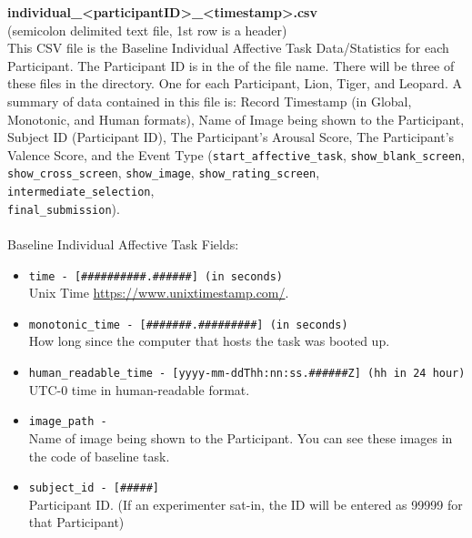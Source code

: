 \begin{description}
\begin{addmargin}[0em]{0em}
        \begin{addmargin}[1em]{0em} %
            \label{individual_<participantID>_<timestamp>.csv}
            \textbf{individual\_<participantID>\_<timestamp>.csv}\\(semicolon delimited text file, 1st row is a header)\\
            This CSV file is the Baseline Individual Affective Task Data/Statistics for
            each Participant. The Participant ID is in the of the file name. There will be
            three of these files in the directory. One for each Participant, Lion, Tiger,
            and Leopard. A summary of data contained in this file is: Record Timestamp (in
            Global, Monotonic, and Human formats), Name of Image being shown to the
            Participant, Subject ID (Participant ID), The Participant's Arousal Score, The
            Participant's Valence Score, and the Event Type (\verb|start_affective_task|,
            \verb|show_blank_screen|, \verb|show_cross_screen|, \verb|show_image|,
            \verb|show_rating_screen|, \verb|intermediate_selection|,\\
            \verb|final_submission|).\\\\
            Baseline Individual Affective Task Fields:
            \begin{itemize}
                \item \verb|time - [##########.######] (in seconds)|\\Unix Time \href{https://www.unixtimestamp.com/}{https://www.unixtimestamp.com/}.
                \item \verb|monotonic_time - [#######.#########] (in seconds)|\\How long since the computer that hosts the task was booted up.
                \item \verb|human_readable_time - [yyyy-mm-ddThh:nn:ss.######Z] (hh in 24 hour)|\\ UTC-0 time in human-readable format.
                \item \verb|image_path -|\\Name of image being shown to the Participant. You can see these images in the code of baseline task.
                \item \verb|subject_id - [#####]|\\Participant ID. (If an experimenter sat-in, the ID will be entered as 99999 for that Participant)

\end{itemize}
\end{addmargin}
\end{addmargin}
\end{description}
